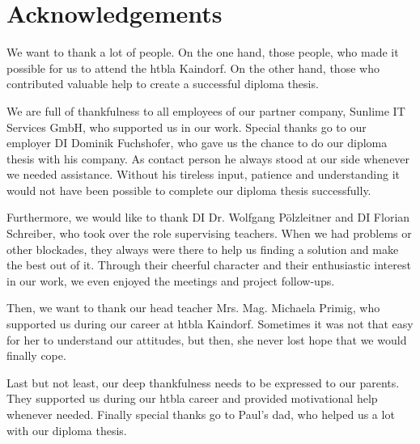 \chapter*{Acknowledgements}
We want to thank a lot of people. On the one hand, those people, who made it possible for us to attend the \gls{htbla} Kaindorf. On the other hand, those who contributed valuable help to create a successful diploma thesis.

We are full of thankfulness to all employees of our partner company, Sunlime IT Services GmbH, who supported us in our work. Special thanks go to our employer DI Dominik Fuchshofer, who gave us the chance to do our diploma thesis with his company. As contact person he always stood at our side whenever we needed assistance. Without his tireless input, patience and understanding it would not have been possible to complete our diploma thesis successfully.

Furthermore, we would like to thank DI Dr. Wolfgang Pölzleitner and DI Florian Schreiber, who took over the role supervising teachers. When we had problems or other blockades, they always were there to help us finding a solution and make the best out of it. Through their cheerful character and their enthusiastic interest in our work, we  even enjoyed the meetings and project follow-ups.

Then, we want to thank our head teacher Mrs. Mag. Michaela Primig, who supported us during our career at \gls{htbla} Kaindorf. Sometimes it was not that easy for her to understand our attitudes, but then, she never lost hope that we would  finally cope.

Last but not least, our deep thankfulness needs to be expressed to our parents. They supported us during our \gls{htbla} career and provided motivational help whenever needed. Finally special thanks go to Paul's dad, who helped us a lot with our diploma thesis.
\clearpageauthor

